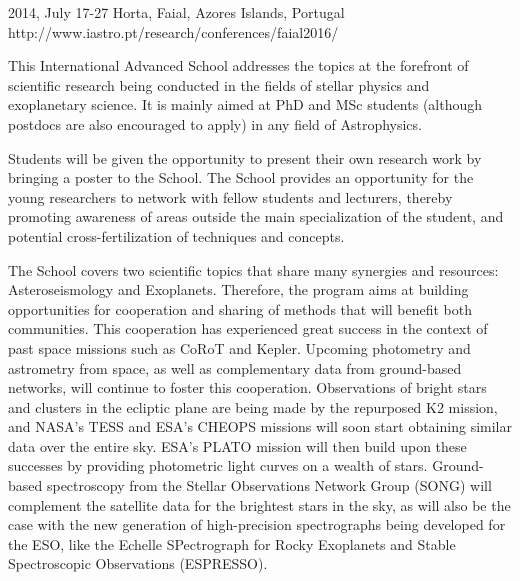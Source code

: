 {2014, July 17-27}%
{Horta, Faial, Azores Islands, Portugal}%
{http://www.iastro.pt/research/conferences/faial2016/}%
{}%
{This International Advanced School addresses the topics at the forefront of scientific research being conducted in the fields of stellar physics and exoplanetary science. It is mainly aimed at PhD and MSc students (although postdocs are also encouraged to apply) in any field of Astrophysics.
    
Students will be given the opportunity to present their own research work by bringing a poster to the School. The School provides an opportunity for the young researchers to network with fellow students and lecturers, thereby promoting awareness of areas outside the main specialization of the student, and potential cross-fertilization of techniques and concepts.
    
The School covers two scientific topics that share many synergies and resources: Asteroseismology and Exoplanets. Therefore, the program aims at building opportunities for cooperation and sharing of methods that will benefit both communities. This cooperation has experienced great success in the context of past space missions such as CoRoT and Kepler. Upcoming photometry and astrometry from space, as well as complementary data from ground-based networks, will continue to foster this cooperation. Observations of bright stars and clusters in the ecliptic plane are being made by the repurposed K2 mission, and NASA's TESS and ESA's CHEOPS missions will soon start obtaining similar data over the entire sky. ESA's PLATO mission will then build upon these successes by providing photometric light curves on a wealth of stars. Ground-based spectroscopy from the Stellar Observations Network Group (SONG) will complement the satellite data for the brightest stars in the sky, as will also be the case with the new generation of high-precision spectrographs being developed for the ESO, like the Echelle SPectrograph for Rocky Exoplanets and Stable Spectroscopic Observations (ESPRESSO).}%

